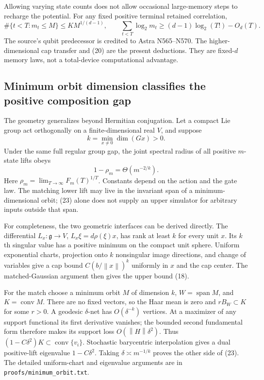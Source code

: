 \documentclass[11pt]{article}
\newcommand{\norm}[1]{\left\lVert#1\right\rVert}
\begin{document}
Allowing varying state counts does not allow occasional large-memory steps to recharge the potential. For any fixed positive terminal retained correlation,
\[
\#\{t<T:m_t\le M\}\le K M^{1/(d-1)},\qquad
\sum_{t<T}\log_2m_t\ge(d-1)\log_2(T!)-O_d(T).\tag{20}
\]
The source's qubit predecessor is credited to Astra N565--N570. The higher-dimensional cap transfer and (20) are the present deductions. They are fixed-$d$ memory laws, not a total-device computational advantage.

\subsection{Minimum orbit dimension classifies the positive composition gap}

The geometry generalizes beyond Hermitian conjugation. Let a compact Lie group act orthogonally on a finite-dimensional real $V$, and suppose
\[
k=\min_{x\ne0}\dim(Gx)>0.
\]
Under the same full regular group gap, the joint spectral radius of all positive $m$-state lifts obeys
\[
1-\rho_m=\Theta(m^{-2/k}).\tag{23}
\]
Here $\rho_m=\lim_{T\to\infty}F_m(T)^{1/T}$. Constants depend on the action and the gate law. The matching lower lift may live in the invariant span of a minimum-dimensional orbit; (23) alone does not supply an upper simulator for arbitrary inputs outside that span.

For completeness, the two geometric interfaces can be derived directly. The differential $L_x:\mathfrak g\to V$, $L_x\xi=d\rho(\xi)x$, has rank at least $k$ for every unit $x$. Its $k$th singular value has a positive minimum on the compact unit sphere. Uniform exponential charts, projection onto $k$ nonsingular image directions, and change of variables give a cap bound $C(b/\norm x)^k$ uniformly in $x$ and the cap center. The matched-Gaussian argument then gives the upper bound (18).

For the match choose a minimum orbit $M$ of dimension $k$, $W=\operatorname{span}M$, and $K=\operatorname{conv}M$. There are no fixed vectors, so the Haar mean is zero and $rB_W\subset K$ for some $r>0$. A geodesic $\delta$-net has $O(\delta^{-k})$ vertices. At a maximizer of any support functional its first derivative vanishes; the bounded second fundamental form therefore makes its support loss $O(\norm H\delta^2)$. Thus $(1-C\delta^2)K\subset\operatorname{conv}\{v_i\}$. Stochastic barycentric interpolation gives a dual positive-lift eigenvalue $1-C\delta^2$. Taking $\delta\asymp m^{-1/k}$ proves the other side of (23). The detailed uniform-chart and eigenvalue arguments are in \texttt{proofs/minimum\_orbit.txt}.
\end{document}
